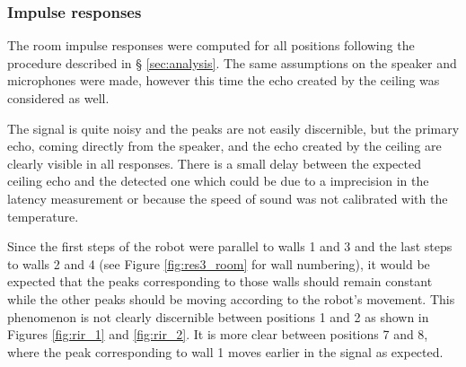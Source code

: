 \subsubsection{Impulse responses}

The room impulse responses were computed for all positions following the procedure described in § \ref{sec:analysis}. The same assumptions on the speaker and microphones were made, however this time the echo created by the ceiling was considered as well.

The signal is quite noisy and the peaks are not easily discernible, but the primary echo, coming directly from the speaker, and the echo created by the ceiling are clearly visible in all responses. 
There is a small delay between the expected ceiling echo and the detected one which could be due to a imprecision in the latency measurement or because the speed of sound was not calibrated with the temperature.

Since the first steps of the robot were parallel to walls 1 and 3 and the last steps to walls 2 and 4 (see Figure \ref{fig:res3_room} for wall numbering), it would be expected that the peaks corresponding to those walls should remain constant while the other peaks should be moving according to the robot's movement. 
This phenomenon is not clearly discernible between positions 1 and 2 as shown in Figures \ref{fig:rir_1} and \ref{fig:rir_2}. It is more clear between positions 7 and 8, where the peak corresponding to wall 1 moves earlier in the signal as expected.

